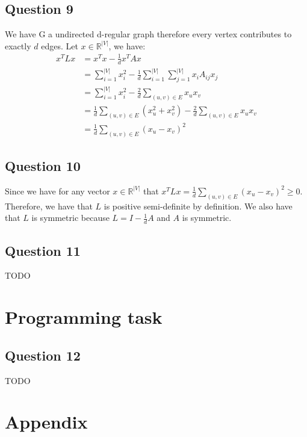 \documentclass{article}
\begin{document}
\subsection{Question 9}
We have G a undirected d-regular graph therefore every vertex contributes to exactly $d$ edges.
Let $x \in \mathbb{R}^{|V|}$, we have:
\begin{align*}
  x^T L x & = x^T x - \frac{1}{d} x^T A x                                                             \\
          & = \sum_{i=1}^{|V|} x_i^2 - \frac{1}{d} \sum_{i=1}^{|V|} \sum_{j=1}^{|V|} x_i A_{ij} x_j   \\
          & = \sum_{i=1}^{|V|} x_i^2 - \frac{2}{d} \sum_{(u,v) \in E} x_u x_v                         \\
          & = \frac{1}{d} \sum_{(u,v) \in E} (x_u^2 + x_v^2) - \frac{2}{d} \sum_{(u,v) \in E} x_u x_v \\
          & = \frac{1}{d} \sum_{(u,v) \in E} (x_u - x_v)^2
\end{align*}

\subsection{Question 10}
Since we have for any vector $x \in \mathbb{R}^{|V|}$ that $x^T L x = \frac{1}{d} \sum_{(u,v) \in E} (x_u - x_v)^2 \geq 0$. Therefore, we have that $L$ is positive semi-definite by definition. We also have that $L$ is symmetric because $L = I - \frac{1}{d} A$ and $A$ is symmetric.

\subsection{Question 11}
TODO

\section{Programming task}

\subsection{Question 12}
TODO

\newpage
\appendix

\section{Appendix}
\end{document}
